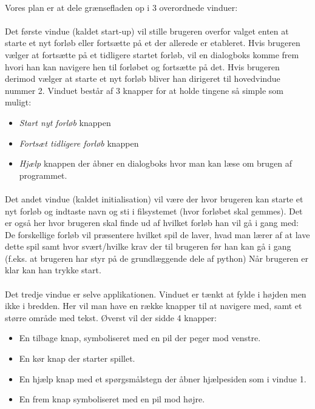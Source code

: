 \documentclass[10pt,a4paper,danish]{article}
\begin{document}
\paragraph{}
Vores plan er at dele grænsefladen op i 3 overordnede vinduer:

\paragraph{}
Det første vindue (kaldet start-up) vil stille brugeren overfor valget enten at starte et 
nyt forløb eller fortsætte på et der allerede er etableret.
Hvis brugeren vælger at fortsætte på et tidligere startet forløb, vil en dialogboks komme 
frem hvori han kan navigere hen til forløbet og fortsætte på det.
Hvis brugeren derimod vælger at starte et nyt forløb bliver han dirigeret til hovedvindue
nummer 2. Vinduet består af 3 knapper for at holde tingene så simple som muligt: 
\begin{itemize}
\item \textit{Start nyt forløb} knappen
\item \textit{Fortsæt tidligere forløb} knappen
\item \textit{Hjælp} knappen der åbner en dialogboks hvor man kan læse om brugen af programmet.
\end{itemize}

\paragraph{}
Det andet vindue (kaldet initialisation) vil være der hvor brugeren kan starte et nyt forløb og
indtaste navn og sti i filsystemet (hvor forløbet skal gemmes).
Det er også her hvor brugeren skal finde ud af hvilket forløb han vil gå i gang med: De forskellige
forløb vil præsentere hvilket spil de laver, hvad man lærer af at lave dette spil samt hvor svært/hvilke
 krav der til brugeren før han kan gå i gang (f.eks. at brugeren har styr på de grundlæggende dele af python)
Når brugeren er klar kan han trykke start.

\paragraph{}
Det tredje vindue er selve applikationen.
Vinduet er tænkt at fylde i højden men ikke i bredden.
Her vil man have en række knapper til at navigere med, samt et større område med tekst.
Øverst vil der sidde 4 knapper: 
\begin{itemize}
  \item En tilbage knap, symboliseret med en pil der peger mod venstre.
  \item En kør knap der starter spillet.
  \item En hjælp knap med et spørgsmålstegn der åbner hjælpesiden som i vindue 1.
  \item En frem knap symboliseret med en pil mod højre.
\end{itemize}
\end{document}
